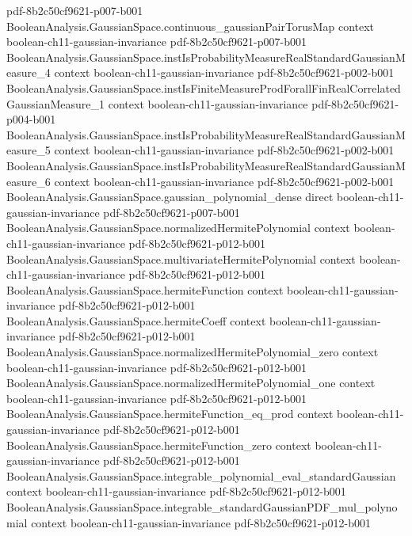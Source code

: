 \begin{theorem}
  {pdf-8b2c50cf9621-p007-b001}
\proofstep
  {BooleanAnalysis.GaussianSpace.continuous_gaussianPairTorusMap}
  {context}
  {boolean-ch11-gaussian-invariance}
  {pdf-8b2c50cf9621-p007-b001}
\proofstep
  {BooleanAnalysis.GaussianSpace.instIsProbabilityMeasureRealStandardGaussianMeasure_4}
  {context}
  {boolean-ch11-gaussian-invariance}
  {pdf-8b2c50cf9621-p002-b001}
\proofstep
  {BooleanAnalysis.GaussianSpace.instIsFiniteMeasureProdForallFinRealCorrelatedGaussianMeasure_1}
  {context}
  {boolean-ch11-gaussian-invariance}
  {pdf-8b2c50cf9621-p004-b001}
\proofstep
  {BooleanAnalysis.GaussianSpace.instIsProbabilityMeasureRealStandardGaussianMeasure_5}
  {context}
  {boolean-ch11-gaussian-invariance}
  {pdf-8b2c50cf9621-p002-b001}
\proofstep
  {BooleanAnalysis.GaussianSpace.instIsProbabilityMeasureRealStandardGaussianMeasure_6}
  {context}
  {boolean-ch11-gaussian-invariance}
  {pdf-8b2c50cf9621-p002-b001}
\proofstep
  {BooleanAnalysis.GaussianSpace.gaussian_polynomial_dense}
  {direct}
  {boolean-ch11-gaussian-invariance}
  {pdf-8b2c50cf9621-p007-b001}
\proofstep
  {BooleanAnalysis.GaussianSpace.normalizedHermitePolynomial}
  {context}
  {boolean-ch11-gaussian-invariance}
  {pdf-8b2c50cf9621-p012-b001}
\proofstep
  {BooleanAnalysis.GaussianSpace.multivariateHermitePolynomial}
  {context}
  {boolean-ch11-gaussian-invariance}
  {pdf-8b2c50cf9621-p012-b001}
\proofstep
  {BooleanAnalysis.GaussianSpace.hermiteFunction}
  {context}
  {boolean-ch11-gaussian-invariance}
  {pdf-8b2c50cf9621-p012-b001}
\proofstep
  {BooleanAnalysis.GaussianSpace.hermiteCoeff}
  {context}
  {boolean-ch11-gaussian-invariance}
  {pdf-8b2c50cf9621-p012-b001}
\proofstep
  {BooleanAnalysis.GaussianSpace.normalizedHermitePolynomial_zero}
  {context}
  {boolean-ch11-gaussian-invariance}
  {pdf-8b2c50cf9621-p012-b001}
\proofstep
  {BooleanAnalysis.GaussianSpace.normalizedHermitePolynomial_one}
  {context}
  {boolean-ch11-gaussian-invariance}
  {pdf-8b2c50cf9621-p012-b001}
\proofstep
  {BooleanAnalysis.GaussianSpace.hermiteFunction_eq_prod}
  {context}
  {boolean-ch11-gaussian-invariance}
  {pdf-8b2c50cf9621-p012-b001}
\proofstep
  {BooleanAnalysis.GaussianSpace.hermiteFunction_zero}
  {context}
  {boolean-ch11-gaussian-invariance}
  {pdf-8b2c50cf9621-p012-b001}
\proofstep
  {BooleanAnalysis.GaussianSpace.integrable_polynomial_eval_standardGaussian}
  {context}
  {boolean-ch11-gaussian-invariance}
  {pdf-8b2c50cf9621-p012-b001}
\proofstep
  {BooleanAnalysis.GaussianSpace.integrable_standardGaussianPDF_mul_polynomial}
  {context}
  {boolean-ch11-gaussian-invariance}
  {pdf-8b2c50cf9621-p012-b001}

\end{theorem}
